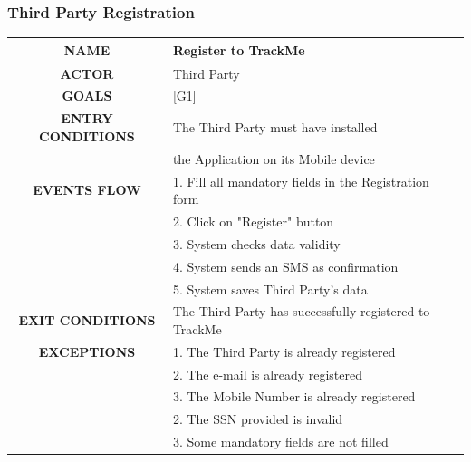 \documentclass[12pt,a4paper]{article}
\begin{document}
	\subsubsection{Third Party Registration }
	\begin{center}
		\begin{tabular}{| c | l |}
			\hline
			\textbf{NAME} & Register to TrackMe \\
			\hline
			\textbf{ACTOR} & Third Party \\
			\hline
			\textbf{GOALS} & [G1] \\
			\hline
			\textbf{ENTRY CONDITIONS} & The Third Party must have installed \\
			&	the Application on its Mobile device \\ \hline
			\textbf{EVENTS FLOW}  &
			1. Fill all mandatory fields in the Registration form\\
			&2. Click on "Register" button\\
			&3. System checks data validity\\
			&4. System sends an SMS as confirmation\\
			&5. System saves Third Party's data\\
			\hline
			\textbf{EXIT CONDITIONS}  & The Third Party has successfully registered to TrackMe \\ \hline
			\textbf{EXCEPTIONS} & 
			1. The Third Party is already registered\\
			&2. The e-mail is already registered\\
			&3. The Mobile Number is already registered\\
			&2. The SSN provided is invalid\\
			&3. Some mandatory fields are not filled\\
			\hline
		\end{tabular}
	\end{center}
\end{document}

